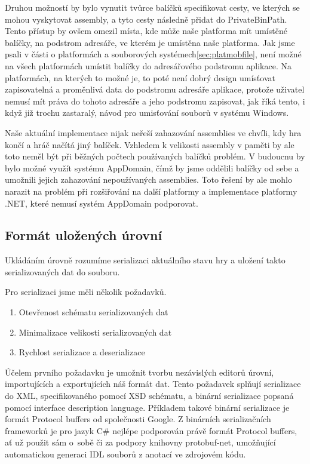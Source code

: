 Druhou možností by bylo vynutit tvůrce balíčků specifikovat cesty, ve kterých se mohou vyskytovat assembly, a tyto cesty následně přidat do PrivateBinPath. Tento přístup by ovšem omezil místa, kde může naše platforma mít umístěné balíčky, na podstrom adresáře, ve kterém je umístěna naše platforma. Jak jsme psali v části o platformách a souborových systémech\ref{sec:platmobfile}, není možné na všech platformách umístit balíčky do adresářového podstromu aplikace. Na platformách, na kterých to možné je, to poté není dobrý design umísťovat zapisovatelná a proměnlivá data do podstromu adresáře aplikace, protože uživatel nemusí mít práva do tohoto adresáře a jeho podstromu zapisovat, jak říká tento, i když již trochu zastaralý, návod pro umisťování souborů v systému Windows\citep{site:windowsappfiles}.

Naše aktuální implementace nijak neřeší zahazování assemblies ve chvíli, kdy hra končí a hráč načítá jiný balíček. Vzhledem k velikosti assembly v paměti by ale toto neměl být při běžných počtech používaných balíčků problém. V budoucnu by bylo možné využít systému AppDomain, čímž by jsme oddělili balíčky od sebe a umožnili jejich zahazování nepoužívaných assemblies. Toto řešení by ale mohlo narazit na problém při rozšiřování na další platformy a implementace platformy .NET, které nemusí systém AppDomain podporovat. 

\subsection{Formát uložených úrovní}
Ukládáním úrovně rozumíme serializaci aktuálního stavu hry a uložení takto serializovaných dat do souboru.

Pro serializaci jsme měli několik požadavků. 
\begin{enumerate}
	\item Otevřenost schématu serializovaných dat
	\item Minimalizace velikosti serializovaných dat
	\item Rychlost serializace a deserializace
\end{enumerate}

Účelem prvního požadavku je umožnit tvorbu nezávislých editorů úrovní, importujících a exportujících náš formát dat. Tento požadavek splňují serializace do XML, specifikovaného pomocí XSD schématu, a binární serializace popsaná pomocí interface description language. Příkladem takové binární serializace je formát Protocol buffers\citep{site:protobuf} od společnosti Google. Z binárních serializačních frameworků je pro jazyk C\# nejlépe podporován právě formát Protocol buffers, ať už použit sám o~sobě či za podpory knihovny protobuf-net, umožňující automatickou generaci IDL souborů z anotací ve zdrojovém kódu. 

